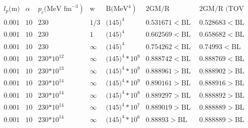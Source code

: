 \documentclass{article}
\begin{document}
\[\begin{array}{ccccccc}
 l_p\text{(m)} & \alpha  & \left.p_c\text{(MeV }\text{fm}^{-3}\right) & \text{w} & \left.\text{B(}\text{MeV}^4\right) & \text{2GM/R (SCGrav)} & \text{2GM/R
(TOV GR)} \\
 0.001 & 10 & 230 & \text{1/3} & \text{(145})^4 & 0.531671<\text{BL} & 0.528683<\text{BL} \\
 0.001 & 10 & 230 & 1 & \text{(145})^4 & 0.662569<\text{BL} & 0.658682<\text{BL} \\
 0.001 & 10 & 230 & \infty  & \text{(145})^4 & 0.754262<\text{BL} & 0.74993<\text{BL} \\
 0.001 & 10 & \text{230*}10^{12} & \infty  & \text{(145})^4*10^9 & 0.888742<\text{BL} & 0.888769<\text{BL} \\
 0.001 & 10 & \text{230*}10^{13} & \infty  & \text{(145})^4*10^9 & 0.888961>\text{BL} & 0.888902>\text{BL} \\
 0.001 & 10 & \text{230*}10^{14} & \infty  & \text{(145})^4*10^9 & 0.890161>\text{BL} & 0.888916>\text{BL} \\
 0.001 & 10 & \text{230*}10^{14} & \infty  & \text{(145})^4*10^8 & 0.889297>\text{BL} & 0.888892>\text{BL} \\
 0.001 & 10 & \text{230*}10^{14} & \infty  & \text{(145})^4*10^7 & 0.889019>\text{BL} & 0.888889>\text{BL} \\
 0.001 & 10 & \text{230*}10^{14} & \infty  & \text{(145})^4*10^6 & 0.88893>\text{BL} & 0.888889>\text{BL} \\
\end{array}\]
\end{document}
